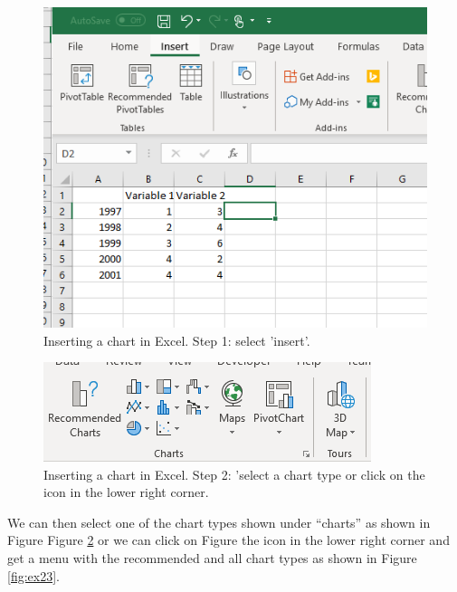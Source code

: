 \documentclass[]{book}
\begin{document}
\begin{figure}

{\centering \includegraphics[width=0.6\linewidth]{_resources/chapter_excelbasic/i1} 

}

\caption{Inserting a chart in Excel. Step 1:  select 'insert'.}\label{fig:ex21}
\end{figure}

\begin{figure}

{\centering \includegraphics[width=0.6\linewidth]{_resources/chapter_excelbasic/i2} 

}

\caption{Inserting a chart in Excel. Step 2: 'select a chart type or click on the icon in the lower right corner.}\label{fig:ex22}
\end{figure}

We can then select one of the chart types shown under ``charts'' as shown in Figure Figure \ref{fig:ex22} or we can click on Figure the icon in the lower right corner and get a menu with the recommended and all chart types as shown in Figure \ref{fig:ex23}.
\end{document}
